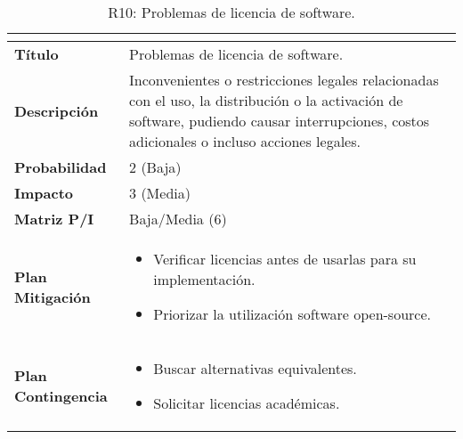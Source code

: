 \begin{table}[H]
\centering
\begin{tabular}{|>{\bfseries}l|p{10cm}|}
\hline
\rowcolor{lightgray}
\multicolumn{2}{|c|}{\textbf{Riesgo R10}} \\ \hline
Título & Problemas de licencia de software.\\ \hline
Descripción & Inconvenientes o restricciones legales relacionadas con el uso, la distribución o la activación de software, pudiendo causar interrupciones, costos adicionales o incluso acciones legales. \\ \hline
Probabilidad & 2 (Baja) \\ \hline
Impacto & 3 (Media) \\ \hline
Matriz P/I & Baja/Media (6)\\ \hline
Plan Mitigación & 
\begin{itemize}
\item Verificar licencias antes de usarlas para su implementación.
\item Priorizar la utilización software open-source.
\end{itemize} \\ \hline
Plan Contingencia & 
\begin{itemize}
\item Buscar alternativas equivalentes.
\item Solicitar licencias académicas.
\end{itemize} \\ \hline
\end{tabular}
\caption{R10: Problemas de licencia de software.}
\label{tab:R10}
\end{table}

